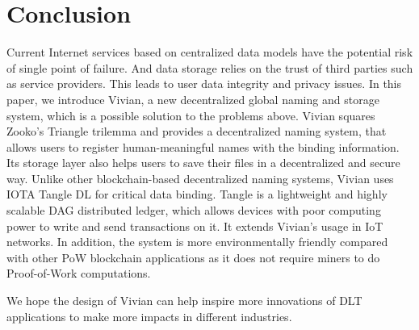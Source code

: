 \section{Conclusion}
\label{sec:conclusion}

Current Internet services based on centralized data models have the potential risk of single point of failure. 
And data storage relies on the trust of third parties such as service providers. This leads to user data integrity and privacy issues.
In this paper, we introduce Vivian, a new decentralized global naming and storage system, which is a possible solution to the problems above.
Vivian squares Zooko's Triangle trilemma and provides a decentralized naming system, that allows users to register human-meaningful names with the binding information.
Its storage layer also helps users to save their files in a decentralized and secure way. 
Unlike other blockchain-based decentralized naming systems, Vivian uses IOTA Tangle DL for critical data binding. 
Tangle is a lightweight and highly scalable DAG distributed ledger, which allows devices with poor computing power to write and send transactions on it.
It extends Vivian's usage in IoT networks.
In addition, the system is more environmentally friendly compared with other PoW blockchain applications as it does not require miners to do Proof-of-Work computations.

We hope the design of Vivian can help inspire more innovations of DLT applications to make more impacts in different industries.

